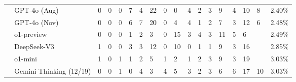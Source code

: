 \begin{table*}[t]
\begin{tabular}{l|p{0.45cm}p{0.45cm}p{0.45cm}p{0.45cm}p{0.45cm}p{0.45cm}|p{0.45cm}p{0.45cm}p{0.45cm}|l|p{0.45cm}p{0.45cm}p{0.45cm}|l|p{0.45cm}|c}
\ \ GPT-4o (Aug) & \cellcolor{ReliableGreen}0 & \cellcolor{ReliableGreen}0 & \cellcolor{ReliableGreen}0 & \cellcolor{ReliableOrange}7 & \cellcolor{ReliableYellow}4 & 22 & \cellcolor{ReliableGreen}0 & \cellcolor{ReliableGreen}0 & \cellcolor{ReliableYellow}4 & \cellcolor{ReliableYellow}2 & \cellcolor{ReliableYellow}3 & 9 & \cellcolor{ReliableYellow}4 & 10 & \cellcolor{ReliableOrange}8 & \cellcolor{ReliableGray}2.40\% \\
\ \ GPT-4o (Nov) & \cellcolor{ReliableGreen}0 & \cellcolor{ReliableGreen}0 & \cellcolor{ReliableGreen}0 & \cellcolor{ReliableOrange}6 & \cellcolor{ReliableOrange}7 & 20 & \cellcolor{ReliableGreen}0 & \cellcolor{ReliableOrange}4 & \cellcolor{ReliableYellow}4 & \cellcolor{ReliableYellow}1 & \cellcolor{ReliableYellow}2 & \cellcolor{ReliableOrange}7 & \cellcolor{ReliableYellow}3 & 12 & \cellcolor{ReliableOrange}6 & \cellcolor{ReliableGray}2.48\% \\
\ \ o1-preview & \cellcolor{ReliableGreen}0 & \cellcolor{ReliableGreen}0 & \cellcolor{ReliableGreen}0 & \cellcolor{ReliableYellow}1 & \cellcolor{ReliableYellow}2 & \cellcolor{ReliableYellow}3 & \cellcolor{ReliableGreen}0 & 15 & \cellcolor{ReliableYellow}3 & \cellcolor{ReliableOrange}4 & \cellcolor{ReliableYellow}3 & 11 & \cellcolor{ReliableOrange}5 & \cellcolor{ReliableOrange}6 &  & \cellcolor{ReliableGray}2.49\% \\
\ \ DeepSeek-V3 & \cellcolor{ReliableYellow}1 & \cellcolor{ReliableGreen}0 & \cellcolor{ReliableGreen}0 & \cellcolor{ReliableYellow}3 & \cellcolor{ReliableYellow}3 & \cellcolor{ReliableOrange}12 & \cellcolor{ReliableGreen}0 & 10 & \cellcolor{ReliableGreen}0 & \cellcolor{ReliableYellow}1 & \cellcolor{ReliableYellow}1 & 9 & \cellcolor{ReliableYellow}3 & 16 &  & \cellcolor{ReliableGray}2.85\% \\
\ \ o1-mini & \cellcolor{ReliableYellow}1 & \cellcolor{ReliableGreen}0 & \cellcolor{ReliableYellow}1 & \cellcolor{ReliableYellow}1 & \cellcolor{ReliableYellow}2 & \cellcolor{ReliableYellow}5 & \cellcolor{ReliableYellow}1 & \cellcolor{ReliableYellow}2 & \cellcolor{ReliableYellow}1 & \cellcolor{ReliableYellow}2 & \cellcolor{ReliableYellow}3 & 9 & \cellcolor{ReliableYellow}3 & 19 &  & \cellcolor{ReliableGray}3.03\% \\
\ \ Gemini Thinking (12/19) & \cellcolor{ReliableGreen}0 & \cellcolor{ReliableGreen}0 & \cellcolor{ReliableYellow}1 & \cellcolor{ReliableGreen}0 & \cellcolor{ReliableYellow}4 & \cellcolor{ReliableYellow}3 & \cellcolor{ReliableYellow}4 & \cellcolor{ReliableOrange}5 & \cellcolor{ReliableYellow}3 & \cellcolor{ReliableYellow}2 & \cellcolor{ReliableYellow}3 & \cellcolor{ReliableOrange}6 & \cellcolor{ReliableOrange}6 & 17 & \cellcolor{ReliableOrange}10 & \cellcolor{ReliableGray}3.03\% \\

\end{tabular}
\end{table*}
